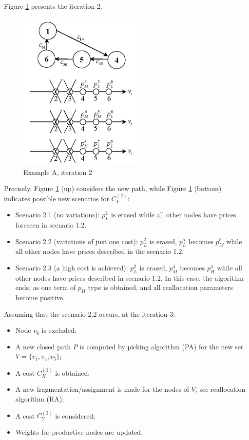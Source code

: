 Figure \ref{fig:exempleA-it2} presents the iteration 2.
\begin{figure}[h]
    \centering
    \includegraphics[height=8cm, keepaspectratio]{images/expA-it2}
    \caption{Example A, iteration 2}
    \label{fig:exempleA-it2}
\end{figure}
Precisely, Figure \ref{fig:exempleA-it2} (up) considers the new path, while Figure \ref{fig:exempleA-it2}  (bottom) indicates possible new scenarios for $C_Y^{(2)}$:
\begin{itemize}
    \item Scenario 2.1 (no variations): $p_L^2$ is erased while all other nodes have prices foreseen in scenario 1.2.
    \item Scenario 2.2 (variations of just one cost): $p_L^2$ is erased, $p_L^5$ becomes $p_M^5$ while all other nodes have prices described in the scenario 1.2.
    \item Scenario 2.3 (a high cost is achieved): $p_L^2$ is erased, $p_M^4$ becomes $p_H^4$ while all other nodes have prices described in scenario 1.2. In this case, the algorithm ends, as one term of $p_H$ type is obtained, and all reallocation parameters become positive.
\end{itemize}
Assuming that the scenario 2.2 occurs, at the iteration 3:
\begin{itemize}
    \item Node $v_6$ is excluded;
    \item A new closed path $P$ is computed by picking algorithm (PA) for the new set $V = \{v_1, v_4, v_5\}$;
    \item A cost $C^{(3)}_X$ is obtained;
    \item A new fragmentation/assignment is made for the nodes of $V$, see reallocation algorithm (RA);
    \item A cost $C_Y^{(3)}$ is considered;
    \item Weights for productive nodes are updated.
\end{itemize}
